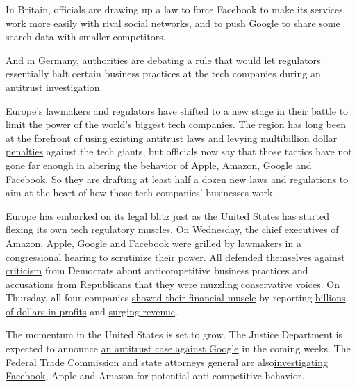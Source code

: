 In Britain, officials are drawing up a law to force Facebook to make its
services work more easily with rival social networks, and to push Google
to share some search data with smaller competitors.

And in Germany, authorities are debating a rule that would let
regulators essentially halt certain business practices at the tech
companies during an antitrust investigation.

Europe's lawmakers and regulators have shifted to a new stage in their
battle to limit the power of the world's biggest tech companies. The
region has long been at the forefront of using existing antitrust laws
and
\href{https://www.nytimes.com/2018/07/18/technology/google-eu-android-fine.html}{levying
multibillion dollar penalties} against the tech giants, but officials
now say that those tactics have not gone far enough in altering the
behavior of Apple, Amazon, Google and Facebook. So they are drafting at
least half a dozen new laws and regulations to aim at the heart of how
those tech companies' businesses work.

Europe has embarked on its legal blitz just as the United States has
started flexing its own tech regulatory muscles. On Wednesday, the chief
executives of Amazon, Apple, Google and Facebook were grilled by
lawmakers in a
\href{https://www.nytimes.com/2020/07/28/technology/amazon-apple-facebook-google-antitrust-hearing.html?action=click\&module=Top\%20Stories\&pgtype=Homepage}{congressional
hearing to scrutinize their power}. All
\href{https://www.nytimes.com/live/2020/07/29/technology/tech-ceos-hearing-testimony}{defended
themselves against criticism} from Democrats about anticompetitive
business practices and accusations from Republicans that they were
muzzling conservative voices. On Thursday, all four companies
\href{https://www.nytimes.com/live/2020/07/30/business/stock-market-today-coronavirus/amazons-earnings-double-as-sales-surge}{showed
their financial muscle} by reporting
\href{https://www.nytimes.com/live/2020/07/30/business/stock-market-today-coronavirus/apple-blows-past-expectations-with-surging-sales-and-profits}{billions
of dollars in profits} and
\href{https://www.nytimes.com/live/2020/07/30/business/stock-market-today-coronavirus/facebook-nearly-doubles-its-profit-but-warns-of-fallout-from-ad-boycotts}{surging
revenue}.

The momentum in the United States is set to grow. The Justice Department
is expected to announce
\href{https://www.nytimes.com/2020/05/15/technology/google-antitrust-investigation.html}{an
antitrust case against Google} in the coming weeks. The Federal Trade
Commission and state attorneys general are
also\href{https://www.nytimes.com/2020/07/17/technology/ftc-facebook-investigation.html}{investigating
Facebook}, Apple and Amazon for potential anti-competitive behavior.

